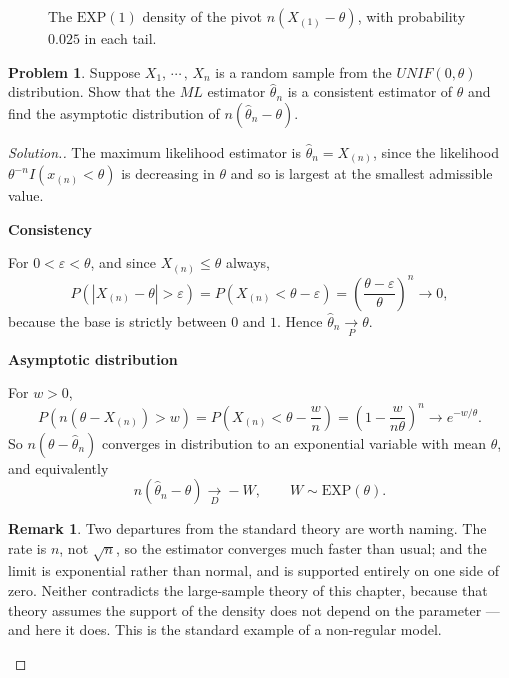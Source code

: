 \documentclass[12pt,a4paper]{report}
\theoremstyle{definition}
\newtheorem*{remark}{Remark}
\newcommand{\subhead}[1]{%
  \par\medskip\noindent\textbf{#1}\par\nobreak\smallskip}
\newtheorem{problemx}{Problem}[section]
\newenvironment{problem}{\begin{problemx}}{\end{problemx}}
\newenvironment{solution}
  {\renewcommand{\qedsymbol}{}\begin{proof}[\textit{Solution}.]}
  {\end{proof}}
\begin{document}
\begin{figure}[H]
\centering
{}
\caption{The $\text{EXP}(1)$ density of the pivot $n(X_{(1)} - \theta)$, with
probability $0.025$ in each tail.}
\label{fig:exptails}
\end{figure}

\begin{problem}
Suppose $X_1, \, \cdots\, , \, X_n$ is a random sample from the $UNIF(0,\theta)$ distribution. Show that the $ML$ estimator $\widehat{\theta}_n$ is a consistent estimator of $\theta$ and find the asymptotic distribution of $n\left(\widehat{\theta}_n - \theta\right)$.
\end{problem}

\begin{solution}
The maximum likelihood estimator is $\widehat{\theta}_n = X_{(n)}$, since the
likelihood $\theta^{-n}I\left(x_{(n)}<\theta\right)$ is decreasing in $\theta$
and so is largest at the smallest admissible value.

\subhead{Consistency}
For $0<\varepsilon<\theta$, and since $X_{(n)}\leq\theta$ always,
\[P\left(\left|X_{(n)}-\theta\right|>\varepsilon\right)
= P\left(X_{(n)}<\theta-\varepsilon\right)
= \left(\frac{\theta-\varepsilon}{\theta}\right)^{n}\longrightarrow 0 ,\]
because the base is strictly between $0$ and $1$. Hence
$\widehat{\theta}_n\underset{P}{\longrightarrow}\theta$.

\subhead{Asymptotic distribution}
For $w>0$,
\[P\left(n\left(\theta-X_{(n)}\right) > w\right)
= P\left(X_{(n)} < \theta - \frac{w}{n}\right)
= \left(1-\frac{w}{n\theta}\right)^{n} \longrightarrow e^{-w/\theta} .\]
So $n\left(\theta-\widehat{\theta}_n\right)$ converges in distribution to an
exponential variable with mean $\theta$, and equivalently
\[n\left(\widehat{\theta}_n - \theta\right) \underset{D}{\longrightarrow} -W,
\qquad W\sim\text{EXP}(\theta).\]

\begin{remark}
Two departures from the standard theory are worth naming. The rate is $n$, not
$\sqrt{n}$, so the estimator converges much faster than usual; and the limit is
exponential rather than normal, and is supported entirely on one side of zero.
Neither contradicts the large-sample theory of this chapter, because that theory
assumes the support of the density does not depend on the parameter --- and here
it does. This is the standard example of a non-regular model.
\end{remark}
\end{solution}
\end{document}
